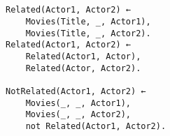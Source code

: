 \subsection{}
\begin{verbatim}
Related(Actor1, Actor2) ←
    Movies(Title, _, Actor1),
    Movies(Title, _, Actor2).
Related(Actor1, Actor2) ←
    Related(Actor1, Actor),
    Related(Actor, Actor2).

NotRelated(Actor1, Actor2) ←
    Movies(_, _, Actor1),
    Movies(_, _, Actor2),
    not Related(Actor1, Actor2).
\end{verbatim}
